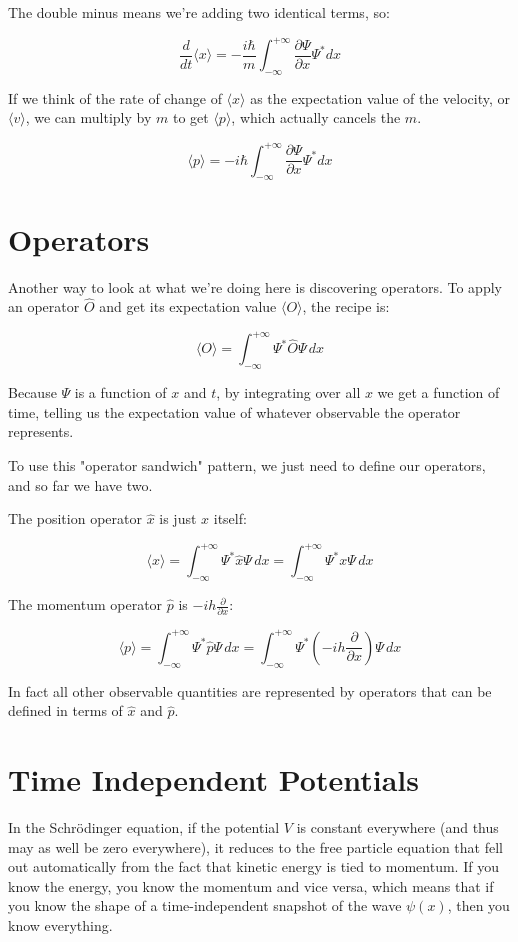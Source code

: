 The double minus means we're adding two identical terms, so:

$$
\frac{d}{dt} \langle x \rangle = -
\frac{i \hbar}{m}
\int_{-\infty}^{+\infty}
\frac{\partial \Psi}{\partial x}\Psi^*
dx
$$

If we think of the rate of change of $\langle x \rangle$ as the expectation value of the velocity, or $\langle v \rangle$, we can multiply by $m$ to get $\langle p \rangle$, which actually cancels the $m$.

$$
\langle p \rangle = -
i \hbar
\int_{-\infty}^{+\infty}
\frac{\partial \Psi}{\partial x}\Psi^*
dx
$$

\section{Operators} \label{sec:qm-operators}

Another way to look at what we're doing here is discovering operators. To apply an operator $\hat{O}$ and get its expectation value $\langle O \rangle$, the recipe is:

$$
\langle O \rangle =
\int_{-\infty}^{+\infty}
\Psi^*
\hat{O}
\Psi
\,dx
$$

Because $\Psi$ is a function of $x$ and $t$, by integrating over all $x$ we get a function of time, telling us the expectation value of whatever observable the operator represents.

To use this "operator sandwich" pattern, we just need to define our operators, and so far we have two.

The position operator $\hat{x}$ is just $x$ itself:

$$
\langle x \rangle =
\int_{-\infty}^{+\infty}
\Psi^*
\hat{x}
\Psi
\,dx
=
\int_{-\infty}^{+\infty}
\Psi^*
x
\Psi
\,dx
$$

The momentum operator $\hat{p}$ is $-ih\frac{\partial}{\partial x}$:

$$
\langle p \rangle =
\int_{-\infty}^{+\infty}
\Psi^*
\hat{p}
\Psi
\,dx
=
\int_{-\infty}^{+\infty}
\Psi^*
(-ih\frac{\partial}{\partial x})
\Psi
\,dx
$$

In fact all other observable quantities are represented by operators that can be defined in terms of $\hat{x}$ and $\hat{p}$.

\section{Time Independent Potentials}

In the Schrödinger equation, if the potential $V$ is constant everywhere (and thus may as well be zero everywhere), it reduces to the free particle equation that fell out automatically from the fact that kinetic energy is tied to momentum. If you know the energy, you know the momentum and vice versa, which means that if you know the shape of a time-independent snapshot of the wave $\psi(x)$, then you know everything.

